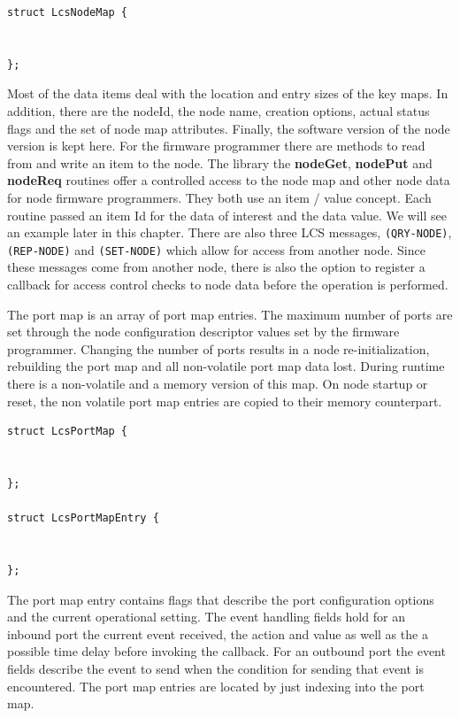 \lstset{language=c++, style=codesnippetstyle}

\begin{center}
\begin{lstlisting}
struct LcsNodeMap {


};
\end{lstlisting}
\end{center}
\FloatBarrier

Most of the data items deal with the location and entry sizes of the key maps. In addition, there are the nodeId, the node name, creation options, actual status flags and the set of node map attributes. Finally, the software version of the node version is kept here. For the firmware programmer there are methods to read from and write an item to the node. The library the \textbf{nodeGet}, \textbf{nodePut} and \textbf{nodeReq} routines offer a controlled access to the node map and other node data for node firmware programmers. They both use an item / value concept. Each routine passed an item Id for the data of interest and the data value. We will see an example later in this chapter. There are also three LCS messages, \texttt{(QRY-NODE)}, \texttt{(REP-NODE)} and \texttt{(SET-NODE)} which allow for access from another node. Since these messages come from another node, there is also the option to register a callback for access control checks to node data before the operation is performed.


The port map is an array of port map entries. The maximum number of ports are set through the node configuration descriptor values set by the firmware programmer. Changing the number of ports results in a node re-initialization, rebuilding the port map and all non-volatile port map data lost. During runtime there is a non-volatile and a memory version of this map. On node startup or reset, the non volatile port map entries are copied to their memory counterpart.

\lstset{language=c++, style=codesnippetstyle}

\begin{lstlisting}
struct LcsPortMap {

  
};

struct LcsPortMapEntry {


};
\end{lstlisting}
\FloatBarrier

The port map entry contains flags that describe the port configuration options and the current operational setting. The event handling fields hold for an inbound port the current event received, the action and value as well as the a possible time delay before invoking the callback. For an outbound port the event fields describe the event to send when the condition for sending that event is encountered. The port map entries are located by just indexing into the port map.

